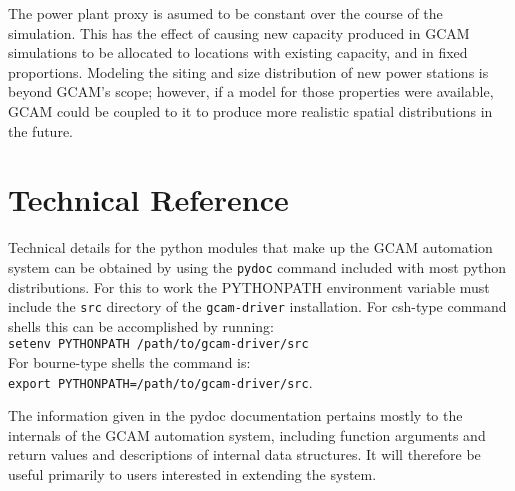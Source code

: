 \documentclass[11pt]{article}
\begin{document}
The power plant proxy is asumed to be constant over the course of the
simulation.  This has the effect of causing new capacity produced in
GCAM simulations to be allocated to locations with existing capacity,
and in fixed proportions.  Modeling the siting and size distribution
of new power stations is beyond GCAM's scope; however, if a model for
those properties were available, GCAM could be coupled to it to
produce more realistic spatial distributions in the future.

\appendix
\section{Technical Reference}
Technical details for the python modules that make up the GCAM
automation system can be obtained by using the \texttt{pydoc} command
included with most python distributions.  For this to work the
PYTHONPATH environment variable must include the \texttt{src}
directory of the \texttt{gcam-driver} installation.  For csh-type
command shells this can be accomplished by running:\\ 
\texttt{setenv PYTHONPATH /path/to/gcam-driver/src}\\
For bourne-type shells the command is:\\
\texttt{export PYTHONPATH=/path/to/gcam-driver/src}.

The information given in the pydoc documentation pertains mostly to
the internals of the GCAM automation system, including function
arguments and return values and descriptions of internal data
structures.  It will therefore be useful primarily to users interested
in extending the system.
\end{document}
